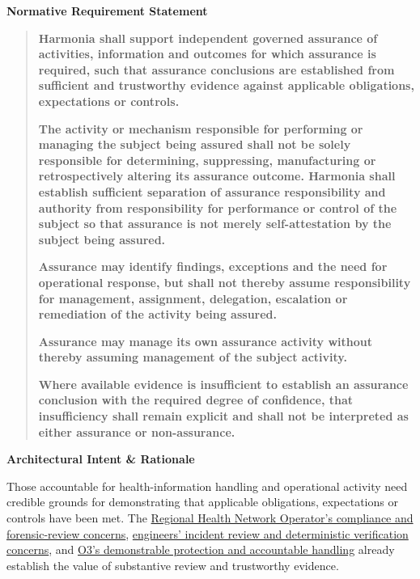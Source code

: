 \par\medskip\textbf{Normative Requirement Statement}\par


\begin{quote}


\textbf{Harmonia shall support independent governed assurance of activities, information and outcomes for which assurance is required, such that assurance conclusions are established from sufficient and trustworthy evidence against applicable obligations, expectations or controls.}



\textbf{The activity or mechanism responsible for performing or managing the subject being assured shall not be solely responsible for determining, suppressing, manufacturing or retrospectively altering its assurance outcome. Harmonia shall establish sufficient separation of assurance responsibility and authority from responsibility for performance or control of the subject so that assurance is not merely self-attestation by the subject being assured.}



\textbf{Assurance may identify findings, exceptions and the need for operational response, but shall not thereby assume responsibility for management, assignment, delegation, escalation or remediation of the activity being assured.}



\textbf{Assurance may manage its own assurance activity without thereby assuming management of the subject activity.}



\textbf{Where available evidence is insufficient to establish an assurance conclusion with the required degree of confidence, that insufficiency shall remain explicit and shall not be interpreted as either assurance or non-assurance.}



\end{quote}


\par\medskip\textbf{Architectural Intent \& Rationale}\par


Those accountable for health-information handling and operational activity need credible grounds for demonstrating that applicable obligations, expectations or controls have been met. The \hyperref[element:e76216c494fa4500bb80eda6f83513c1]{Regional Health Network Operator's compliance and forensic-review concerns}, \hyperref[element:c20aa17ce4aa4a58be5eb3cff2ecdd1d]{engineers' incident review and deterministic verification concerns}, and \hyperref[element:75519ed8f7de4a619cc9065f525d703a]{O3's demonstrable protection and accountable handling} already establish the value of substantive review and trustworthy evidence.



